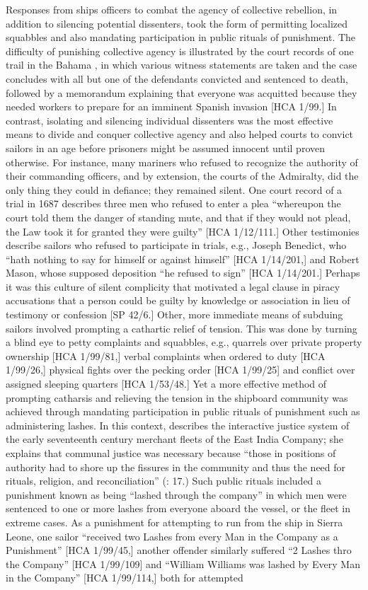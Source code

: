    Responses from ships officers to combat the agency of collective rebellion, in addition to silencing potential dissenters, took the form of permitting localized squabbles and also mandating participation in public rituals of punishment. The difficulty of punishing collective agency is illustrated by the court records of one trail in the Bahama \citealt{Islands1722}, in which various witness statements are taken and the case concludes with all but one of the defendants convicted and sentenced to death, followed by a memorandum explaining that everyone was acquitted because they needed workers to prepare for an imminent Spanish invasion [HCA 1/99.] In contrast, isolating and silencing individual dissenters was the most effective means to divide and conquer collective agency and also helped courts to convict sailors in an age before prisoners might be assumed innocent until proven otherwise. For instance, many mariners who refused to recognize the authority of their commanding officers, and by extension, the courts of the Admiralty, did the only thing they could in defiance; they remained silent. One court record of a trial in 1687 describes three men who refused to enter a plea “whereupon the court told them the danger of standing mute, and that if they would not plead, the Law took it for granted they were guilty” [HCA 1/12/111.] Other testimonies describe sailors who refused to participate in trials, e.g., Joseph Benedict, who “hath nothing to say for himself or against himself” [HCA 1/14/201,] and Robert Mason, whose supposed deposition “he refused to sign” [HCA 1/14/201.] Perhaps it was this culture of silent complicity that motivated a legal clause in piracy accusations that a person could be guilty by knowledge or association in lieu of testimony or confession [SP 42/6.] Other, more immediate means of subduing sailors involved prompting a cathartic relief of tension. This was done by turning a blind eye to petty complaints and squabbles, e.g., quarrels over private property ownership [HCA 1/99/81,] verbal complaints when ordered to duty [HCA 1/99/26,] physical fights over the pecking order [HCA 1/99/25] and conflict over assigned sleeping quarters [HCA 1/53/48.] Yet a more effective method of prompting catharsis and relieving the tension in the shipboard community was achieved through mandating participation in public rituals of punishment such as administering lashes. In this context, \citet{Fury2015} describes the interactive justice system of the early seventeenth century merchant fleets of the East India Company; she explains that communal justice was necessary because “those in positions of authority had to shore up the fissures in the community and thus the need for rituals, religion, and reconciliation” (\citealt{Fury2015}: 17.) Such public rituals included a punishment known as being “lashed through the company” in which men were sentenced to one or more lashes from everyone aboard the vessel, or the fleet in extreme cases. As a punishment for attempting to run from the ship in Sierra Leone, one sailor “received two Lashes from every Man in the Company as a Punishment” [HCA 1/99/45,] another offender similarly suffered “2 Lashes thro the Company” [HCA 1/99/109] and “William Williams was lashed by Every Man in the Company” [HCA 1/99/114,] both for attempted 